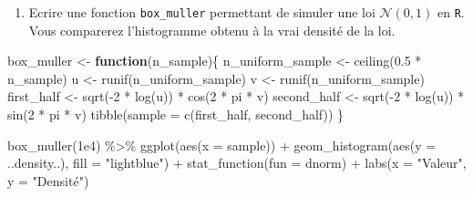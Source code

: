 \documentclass[
]{article}
\newenvironment{Shaded}{\begin{snugshade}}{\end{snugshade}}
\newcommand{\AttributeTok}[1]{\textcolor[rgb]{0.77,0.63,0.00}{#1}}
\newcommand{\ControlFlowTok}[1]{\textcolor[rgb]{0.13,0.29,0.53}{\textbf{#1}}}
\newcommand{\DecValTok}[1]{\textcolor[rgb]{0.00,0.00,0.81}{#1}}
\newcommand{\FloatTok}[1]{\textcolor[rgb]{0.00,0.00,0.81}{#1}}
\newcommand{\FunctionTok}[1]{\textcolor[rgb]{0.00,0.00,0.00}{#1}}
\newcommand{\NormalTok}[1]{#1}
\newcommand{\OtherTok}[1]{\textcolor[rgb]{0.56,0.35,0.01}{#1}}
\newcommand{\SpecialCharTok}[1]{\textcolor[rgb]{0.00,0.00,0.00}{#1}}
\newcommand{\StringTok}[1]{\textcolor[rgb]{0.31,0.60,0.02}{#1}}
\providecommand{\tightlist}{%
  \setlength{\itemsep}{0pt}\setlength{\parskip}{0pt}}
\begin{document}
\begin{enumerate}
\def\labelenumi{\arabic{enumi}.}
\setcounter{enumi}{1}
\tightlist
\item
  Ecrire une fonction \texttt{box\_muller} permettant de simuler une loi
  \(\mathcal{N}(0, 1)\) en \texttt{R}. Vous comparerez l'histogramme
  obtenu à la vrai densité de la loi.
\end{enumerate}

\begin{Shaded}
\begin{Highlighting}[]
\NormalTok{box\_muller }\OtherTok{\textless{}{-}} \ControlFlowTok{function}\NormalTok{(n\_sample)\{}
\NormalTok{  n\_uniform\_sample }\OtherTok{\textless{}{-}} \FunctionTok{ceiling}\NormalTok{(}\FloatTok{0.5} \SpecialCharTok{*}\NormalTok{ n\_sample)}
\NormalTok{  u }\OtherTok{\textless{}{-}} \FunctionTok{runif}\NormalTok{(n\_uniform\_sample)}
\NormalTok{  v }\OtherTok{\textless{}{-}} \FunctionTok{runif}\NormalTok{(n\_uniform\_sample)}
\NormalTok{  first\_half }\OtherTok{\textless{}{-}} \FunctionTok{sqrt}\NormalTok{(}\SpecialCharTok{{-}}\DecValTok{2} \SpecialCharTok{*} \FunctionTok{log}\NormalTok{(u)) }\SpecialCharTok{*} \FunctionTok{cos}\NormalTok{(}\DecValTok{2} \SpecialCharTok{*}\NormalTok{ pi }\SpecialCharTok{*}\NormalTok{ v)}
\NormalTok{  second\_half }\OtherTok{\textless{}{-}} \FunctionTok{sqrt}\NormalTok{(}\SpecialCharTok{{-}}\DecValTok{2} \SpecialCharTok{*} \FunctionTok{log}\NormalTok{(u)) }\SpecialCharTok{*} \FunctionTok{sin}\NormalTok{(}\DecValTok{2} \SpecialCharTok{*}\NormalTok{ pi }\SpecialCharTok{*}\NormalTok{ v)}
  \FunctionTok{tibble}\NormalTok{(}\AttributeTok{sample =} \FunctionTok{c}\NormalTok{(first\_half, second\_half))}
\NormalTok{\}}
\end{Highlighting}
\end{Shaded}

\begin{Shaded}
\begin{Highlighting}[]
\FunctionTok{box\_muller}\NormalTok{(}\FloatTok{1e4}\NormalTok{) }\SpecialCharTok{\%\textgreater{}\%} 
  \FunctionTok{ggplot}\NormalTok{(}\FunctionTok{aes}\NormalTok{(}\AttributeTok{x =}\NormalTok{ sample)) }\SpecialCharTok{+}
  \FunctionTok{geom\_histogram}\NormalTok{(}\FunctionTok{aes}\NormalTok{(}\AttributeTok{y =}\NormalTok{ ..density..), }\AttributeTok{fill =} \StringTok{"lightblue"}\NormalTok{) }\SpecialCharTok{+}
  \FunctionTok{stat\_function}\NormalTok{(}\AttributeTok{fun =}\NormalTok{ dnorm) }\SpecialCharTok{+}
  \FunctionTok{labs}\NormalTok{(}\AttributeTok{x =} \StringTok{"Valeur"}\NormalTok{, }\AttributeTok{y =} \StringTok{"Densité"}\NormalTok{)}
\end{Highlighting}
\end{Shaded}
\end{document}
